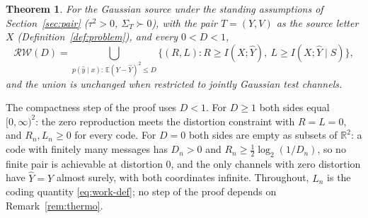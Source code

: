 \documentclass[11pt,onecolumn]{IEEEtran}
\newtheorem{theorem}{Theorem}
\newcommand{\E}{\mathbb{E}}
\newcommand{\R}{\mathbb{R}}
\newcommand{\hY}{\widehat{Y}}
\newcommand{\RW}{\mathcal{R}\!\mathcal{W}}
\begin{document}
\begin{theorem}\label{thm:gaussop}
For the Gaussian source under the standing assumptions of
Section~\ref{sec:pair} ($\tau^2>0$, $\Sigma_T\succ0$), with the pair
$T=(Y,V)$ as the source letter $X$ (Definition~\ref{def:problem}), and
every $0<D<1$,
\[
\RW(D)=\bigcup_{p(\hat y\mid x):\,\E(Y-\hY)^2\le D}
\bigl\{(R,L):R\ge I(X;\hY),\ L\ge I(X;\hY\mid S)\bigr\},
\]
and the union is unchanged when restricted to jointly Gaussian test
channels.
\end{theorem}

The compactness step of the proof uses $D<1$. For $D\ge1$ both sides
equal $[0,\infty)^2$: the zero reproduction meets the distortion
constraint with $R=L=0$, and $R_n,L_n\ge0$ for every code. For $D=0$
both sides are empty as subsets of $\R^2$: a code with finitely many
messages has $D_n>0$ and $R_n\ge\tfrac12\log_2(1/D_n)$, so no finite
pair is achievable at distortion $0$, and the only channels with zero
distortion have $\hY=Y$ almost surely, with both coordinates infinite.
Throughout, $L_n$ is the coding quantity
\eqref{eq:work-def}; no step of the proof depends on
Remark~\ref{rem:thermo}.
\end{document}
